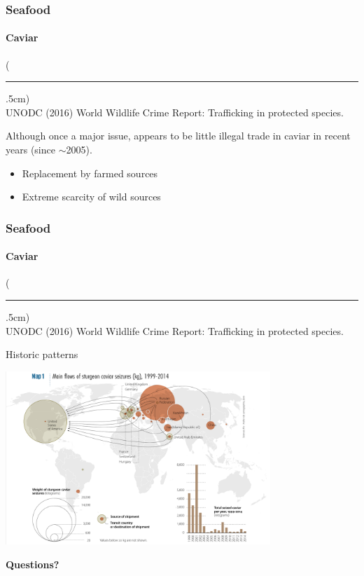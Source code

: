 \documentclass[10pt]{beamer}
\newenvironment{reference}[2]{%
	\begin{textblock*}{\textwidth}(#1,#2)
		\tiny\bgroup\color{gray}}{\egroup\end{textblock*}}
\begin{document}
\begin{frame}[t]
\frametitle{Seafood}
\framesubtitle{Caviar}
\vspace{0.5cm}

	\begin{reference}{4mm}{92mm}
		\rule{1.5cm}{0.25pt}\\
		UNODC (2016) World Wildlife Crime Report: Trafficking in protected species.
	\end{reference}
	
	Although once a major issue, appears to be little illegal trade in caviar in recent years (since $\sim$2005).\\
	\medskip
		\begin{itemize}
			\item Replacement by farmed sources
			\medskip
			\item Extreme scarcity of wild sources
		\end{itemize}
\end{frame}


\begin{frame}[t]
\frametitle{Seafood}
\framesubtitle{Caviar}
\vspace{0.5cm}

	\begin{reference}{4mm}{92mm}
		\rule{1.5cm}{0.25pt}\\
		UNODC (2016) World Wildlife Crime Report: Trafficking in protected species.
	\end{reference}
	
	Historic patterns\\
	
	\vspace{0.25cm}
	
	\begin{center}
		\includegraphics[width=0.75\textwidth]{figures/map7.png}
	\end{center}
\end{frame}


\begin{frame}
	\begin{center}
		\Large{\textbf{\textcolor{myblue}{Questions?}}}
	\end{center}
\end{frame}
\end{document}

